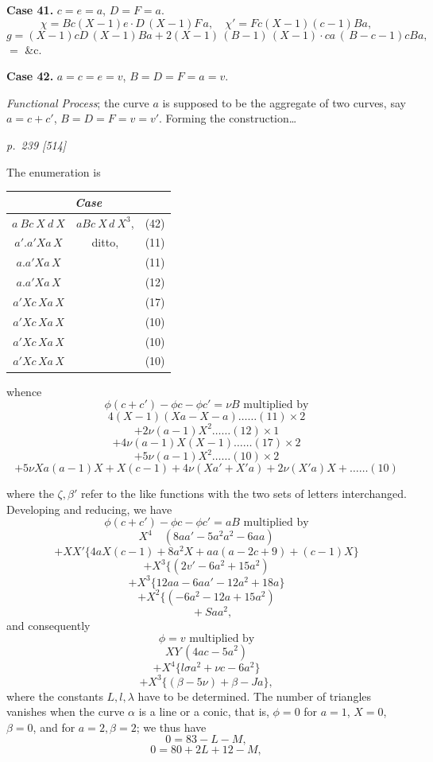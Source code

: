 \documentclass[11pt,a4paper]{article}
\theoremstyle{plain}
\theoremstyle{definition}
\begin{document}
\textbf{Case 41.}  $c=e=a$, $D=F=a$.
\[
\chi=Bc(X-1)e\cdot D\,(X-1)F\,a, \quad \chi'=Fc(X-1)(c-1)Ba,
\]
\[
g=(X-1)cD\,(X-1)Ba+2(X-1)\,(B-1)\,(X-1)\cdot ca\,(\,B-c-1)cBa,
\]
$=$ \&c.

\textbf{Case 42.}  $a=c=e=v$, $B=D=F=a=v$.

\textit{Functional Process}; the curve $a$ is supposed to be the aggregate of two curves, say
$a=c+c'$, $B=D=F=v=v'$.  Forming the construction\ldots

\clearpage

\bigskip
\textit{p.~239 [514]}
\smallskip

The enumeration is
\begin{center}
\begin{tabular}{|c|c|c|}
\hline
\multicolumn{3}{|c|}{\textit{Case}} \\
\hline
$a\ Bc\ X\ d\ X$ & $aBc\ X\,d\ X^3$, & (42) \\
\hline
$a' . a' Xa\,X$ & ditto, & (11) \\
$a . a' Xa\,X$ & & (11) \\
$a . a' Xa\,X$ & & (12) \\
$a' Xc\,Xa\,X$ & & (17) \\
$a' Xc\,Xa\,X$ & & (10) \\
$a' Xc\,Xa\,X$ & & (10) \\
$a' Xc\,Xa\,X$ & & (10) \\
\hline
\end{tabular}
\end{center}

whence
\[
\phi(c+c')-\phi c-\phi c'=\nu B \text{ multiplied by}
\]
\[
4(X-1)(Xa-X-a)\ldots\ldots(11)\times 2
\]
\[
+2\nu(a-1)X^2\ldots\ldots(12)\times 1
\]
\[
+4\nu(a-1)X(X-1)\ldots\ldots(17)\times 2
\]
\[
+5\nu(a-1)X^2\ldots\ldots(10)\times 2
\]
\[
+5\nu Xa(a-1)X+X(c-1)+4\nu(Xa'+X'a)+2\nu(X'a)X+\ldots\ldots(10)
\]

where the $\zeta, \beta'$ refer to the like functions with the two sets of letters interchanged.
Developing and reducing, we have
\[
\phi(c+c')-\phi c-\phi c'=aB \text{ multiplied by}
\]
\[
X^4 \quad (8aa'-5a^2a^2-6aa)
\]
\[
+XX'\{4aX(c-1)+8a^2X+aa(a-2c+9)+(c-1)X\}
\]
\[
+X^3 \{(2v'-6a^2+15a^2)
\]
\[
+X^3 \{12aa-6aa'-12a^2+18a\}
\]
\[
+X^2 \{(-6a^2-12a+15a^2)
\]
\[
\quad +Saa^2,
\]
and consequently
\[
\phi=v \text{ multiplied by}
\]
\[
XY\,(4a c-5a^2)
\]
\[
+X^4\{l\sigma a^2+\nu c-6a^2\}
\]
\[
+X^3 \{(\beta-5\nu)+\beta-Ja\},
\]
where the constants $L, l, \lambda$ have to be determined.  The number of triangles vanishes
when the curve $\alpha$ is a line or a conic, that is, $\phi=0$ for $a=1$, $X=0$, $\beta=0$, and for
$a=2, \beta=2$; we thus have
\[
0=83-L-M,
\]
\[
0=80+2L+12-M,
\]
\end{document}
